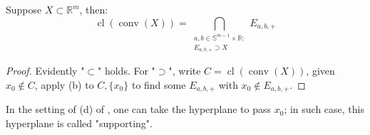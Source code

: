 \begin{coro}\label{coro:015-halfspaces-intersection}
	Suppose $X\subset \mathbb{R}^m$, then:
	\[
		\operatorname{cl}(\operatorname{conv}(X))=\bigcap_{\substack{a,b\in \mathbb{S}^{m-1}\times \mathbb{R}:\\E_{a,b,+}\supset X}}E_{a,b,+}
	\]
\end{coro}
\begin{proof}
	Evidently "$\subset$" holds. For "$\supset$", write $C=\operatorname{cl}(\operatorname{conv}(X))$, given $x_0\notin C$, apply (b) to $C,\{x_0\}$ to find some $E_{a,b,+}$ with $x_0\notin E_{a,b,+}$.
\end{proof}

\begin{rmrk}
	In the setting of (d) of , one can take the hyperplane to pass $x_0$; in such case, this hyperplane is called "supporting".
\end{rmrk}
